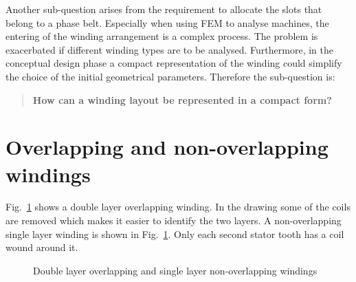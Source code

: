 Another sub-question arises from the requirement to allocate the slots that belong to a phase belt. Especially when using FEM to analyse machines, the entering of the winding arrangement is a complex process. The problem is exacerbated if different winding types are to be analysed. Furthermore, in the conceptual design phase a compact representation of the winding could simplify the choice of the initial geometrical parameters. Therefore the sub-question is: 
\begin{quote}
\textbf{How can a winding layout be represented in a compact form?} 
\end{quote}

\section{Overlapping and non-overlapping windings}\label{sec:def_con}  
Fig.~\ref{fig:flux_coils} shows a double layer overlapping winding. In the drawing some of the coils are removed which makes it easier to identify the two layers. A non-overlapping single layer winding is shown in Fig.~\ref{fig:flux_coils}. Only each second stator tooth has a coil wound around it. 
\begin{figure}[htbp]
  \fontsize{6}{8}\selectfont
  \centering
  \hfill
  \caption{Double layer overlapping and single layer non-overlapping windings}
  \label{fig:flux_coils}
\end{figure}

